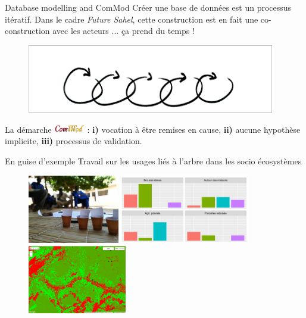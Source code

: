 \documentclass[newPxFont]{beamer}
\begin{document}
\begin{frame}[c]{Database modelling and ComMod}
\vspace{-2em}
Créer une base de données est un processus itératif. Dans le cadre \textit{Future Sahel}, cette construction est en fait une co-construction avec les acteurs ... ça prend du temps !
\begin{figure}
	\centering
	\includegraphics[height = 3cm]{img/iteration}
\end{figure}
La démarche \includegraphics[height = 0.4cm]{img/logo_commod} : \textbf{i)} vocation à être remises en cause, \textbf{ii)} aucune hypothèse implicite, \textbf{iii)} processus de
validation.

\end{frame}

\begin{frame}[c]{En guise d'exemple}
\vspace{-2em}
Travail sur les usages liés à l'arbre dans les socio écosystèmes
\begin{figure}
	\centering
	\includegraphics[height = 3cm]{img/ateliers}
  \includegraphics[height = 3cm]{img/bar_general}\\
  \includegraphics[height = 3cm]{img/class_CART}
\end{figure}
\end{frame}
\end{document}
